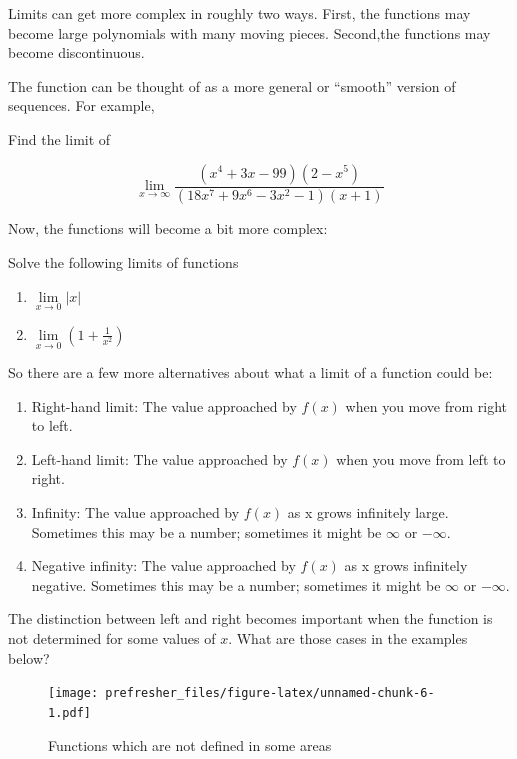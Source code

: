 \documentclass[]{book}
\providecommand{\tightlist}{%
  \setlength{\itemsep}{0pt}\setlength{\parskip}{0pt}}
\theoremstyle{definition}
\theoremstyle{definition}
\theoremstyle{definition}
\theoremstyle{remark}
\let\BeginKnitrBlock\begin \let\EndKnitrBlock\end
\begin{document}
Limits can get more complex in roughly two ways. First, the functions may become large polynomials with many moving pieces. Second,the functions may become discontinuous.

The function can be thought of as a more general or ``smooth'' version of sequences. For example,

\BeginKnitrBlock{exercise}[Limits of a Fraction of Functions]
\protect\hypertarget{exr:limfunmax}{}{\label{exr:limfunmax} {} }
Find the limit of

\[\lim_{x\to\infty} \frac{(x^4 +3x−99)(2−x^5)}{(18x^7 +9x^6 −3x^2 −1)(x+1)}\]
\EndKnitrBlock{exercise}

Now, the functions will become a bit more complex:

\BeginKnitrBlock{exercise}
\protect\hypertarget{exr:discontlim}{}{\label{exr:discontlim} }Solve the following limits of functions

\begin{enumerate}
\def\labelenumi{\arabic{enumi}.}
\tightlist
\item
  \(\lim\limits_{x\to 0} |x|\)
\item
  \(\lim\limits_{x\to 0} \left(1+\frac{1}{x^2}\right)\)
\end{enumerate}
\EndKnitrBlock{exercise}

So there are a few more alternatives about what a limit of a function could be:

\begin{enumerate}
\def\labelenumi{\arabic{enumi}.}
\tightlist
\item
  Right-hand limit: The value approached by \(f(x)\) when you move from right to left.
\item
  Left-hand limit: The value approached by \(f(x)\) when you move from left to right.
\item
  Infinity: The value approached by \(f(x)\) as x grows infinitely large. Sometimes this may be a number; sometimes it might be \(\infty\) or \(-\infty\).
\item
  Negative infinity: The value approached by \(f(x)\) as x grows infinitely negative. Sometimes this may be a number; sometimes it might be \(\infty\) or \(-\infty\).
\end{enumerate}

The distinction between left and right becomes important when the function is not determined for some values of \(x\). What are those cases in the examples below?

\begin{figure}
\centering
\texttt{[image: prefresher\_files/figure-latex/unnamed-chunk-6-1.pdf]}
\caption{\label{fig:unnamed-chunk-6}Functions which are not defined in some areas}
\end{figure}
\end{document}

